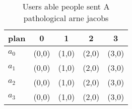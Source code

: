 \documentclass[a4paper]{article}
\begin{document}
\begin{table}
\begin{adjustbox}{width=0.5\columnwidth}
\begin{tabular}{|l|l|l|l|l|}
\hline
\textbf{plan} & \multicolumn{1}{c|}{\textbf{0}} & \multicolumn{1}{c|}{\textbf{1}} & \multicolumn{1}{c|}{\textbf{2}} & \multicolumn{1}{c|}{\textbf{3}} \\ \hline
\textbf{$a_0$}  & (0,0) & (1,0) & (2,0) & (3,0) \\ \hline
\textbf{$a_1$}  & (0,0) & (1,0) & (2,0) & (3,0) \\ \hline
\textbf{$a_2$}  & (0,0) & (1,0) & (2,0) & (3,0) \\ \hline
\textbf{$a_3$}  & (0,0) & (1,0) & (2,0) & (3,0) \\ \hline
\end{tabular}
\end{adjustbox}
\caption{Users able people sent A pathological arne jacobs
}
\end{table}
\end{document}
